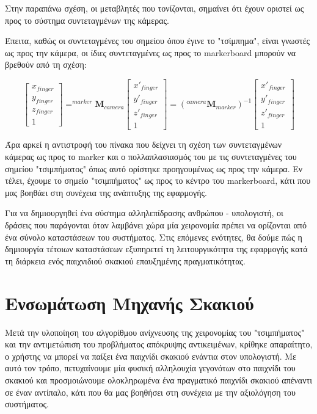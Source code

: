 Στην παραπάνω σχέση, οι μεταβλητές που τονίζονται, σημαίνει ότι έχουν οριστεί ως προς το σύστημα συντεταγμένων της κάμερας.

Έπειτα, καθώς οι συντεταγμένες του σημείου όπου έγινε το "τσίμπημα", είναι γνωστές ως προς την κάμερα, οι ίδιες συντεταγμένες ως προς το markerboard μπορούν να βρεθούν από τη σχέση:


\begin{equation}
\begin{bmatrix}
x_{finger} \\ y_{finger} \\ z_{finger} \\ 1
\end{bmatrix}
=
^{marker}\mathbf{M}_{camera}
\begin{bmatrix}
x'_{finger} \\ y'_{finger} \\ z'_{finger} \\ 1
\end{bmatrix}
=
(^{camera}\mathbf{M}_{marker})^{-1}
\begin{bmatrix}
x'_{finger} \\ y'_{finger} \\ z'_{finger} \\ 1
\end{bmatrix}
\end{equation}


Άρα αρκεί η αντιστροφή του πίνακα που δείχνει τη σχέση των συντεταγμένων κάμερας ως προς το marker και ο πολλαπλασιασμός του με τις συντεταγμένες του σημείου "τσιμπήματος" όπως αυτό ορίστηκε προηγουμένως ως προς την κάμερα. Εν τέλει, έχουμε το σημείο "τσιμπήματος" ως προς το κέντρο του markerboard, κάτι που μας βοηθάει στη συνέχεια της ανάπτυξης της εφαρμογής.




Για να δημιουργηθεί ένα σύστημα αλληλεπίδρασης ανθρώπου - υπολογιστή, οι δράσεις που παράγονται όταν λαμβάνει χώρα μία χειρονομία πρέπει να ορίζονται από ένα σύνολο καταστάσεων του συστήματος. Στις επόμενες ενότητες, θα δούμε πώς η δημιουργία τέτοιων καταστάσεων εξυπηρετεί τη λειτουργικότητα της εφαρμογής κατά τη διάρκεια ενός παιχνιδιού σκακιού επαυξημένης πραγματικότητας.


\section{Ενσωμάτωση Μηχανής Σκακιού}

Μετά την υλοποίηση του αλγορίθμου ανίχνευσης της χειρονομίας του "τσιμπήματος" και την αντιμετώπιση του προβλήματος απόκρυψης αντικειμένων, κρίθηκε απαραίτητο, ο χρήστης να μπορεί να παίξει ένα παιχνίδι σκακιού ενάντια στον υπολογιστή. Με αυτό τον τρόπο, πετυχαίνουμε μία φυσική αλληλουχία γεγονότων στο παιχνίδι του σκακιού και προσμοιώνουμε ολοκληρωμένα ένα πραγματικό παιχνίδι σκακιού απέναντι σε έναν αντίπαλο, κάτι που θα μας βοηθήσει στη συνέχεια με την αξιολόγηση του συστήματος. 



